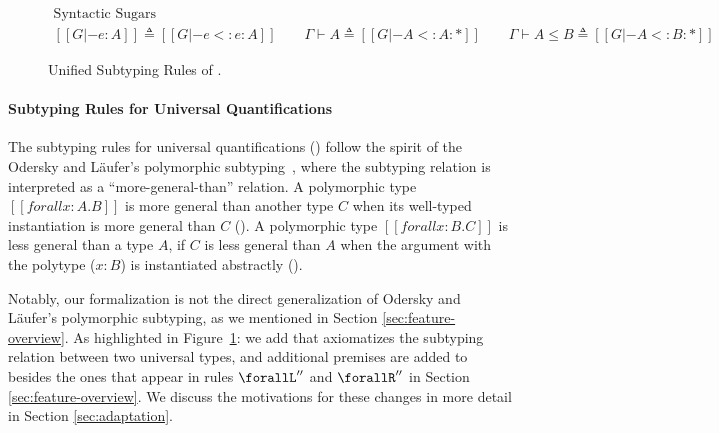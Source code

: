 \begin{figure}
    \setlength{\abovedisplayskip}{0pt}
    \setlength{\abovedisplayshortskip}{0pt}
    \begin{gather*}
       \text{Syntactic Sugars} \\
       [[G |- e : A]] \triangleq [[G |- e <: e : A]]
      \qquad \Gamma \vdash A \triangleq [[G |- A <: A : *]]
      \qquad \Gamma \vdash A \le B \triangleq [[G |- A <: B : *]]
    \end{gather*}
    \caption{Unified Subtyping Rules of \name.}
    \label{fig:typing}
\end{figure}

\paragraph{Subtyping Rules for Universal Quantifications}
The subtyping rules for universal quantifications ()
follow the spirit of the Odersky and L\"aufer's polymorphic subtyping~\citep{odersky1996putting,dunfield2013complete},
where the subtyping relation is interpreted as a ``more-general-than'' relation.
A polymorphic type $[[forall x : A. B]]$
is more general than another type $C$ when its well-typed
instantiation is more general than $C$ (). A polymorphic
type $[[forall x : B. C]]$ is less general than a type $A$,
if $C$ is less general than $A$ when the argument with the polytype ($x:B$)
is instantiated abstractly ().

Notably, our formalization is not the direct generalization of
Odersky and L\"aufer's polymorphic subtyping, as we mentioned in Section \ref{sec:feature-overview}.
As highlighted in Figure~\ref{fig:typing}:
we add  that axiomatizes the subtyping relation between two universal types,
and additional premises are added to  besides the
ones that appear in rules $\forallL''$ and $\forallR''$ in Section \ref{sec:feature-overview}.
We discuss the motivations for these changes in more detail in Section \ref{sec:adaptation}.

